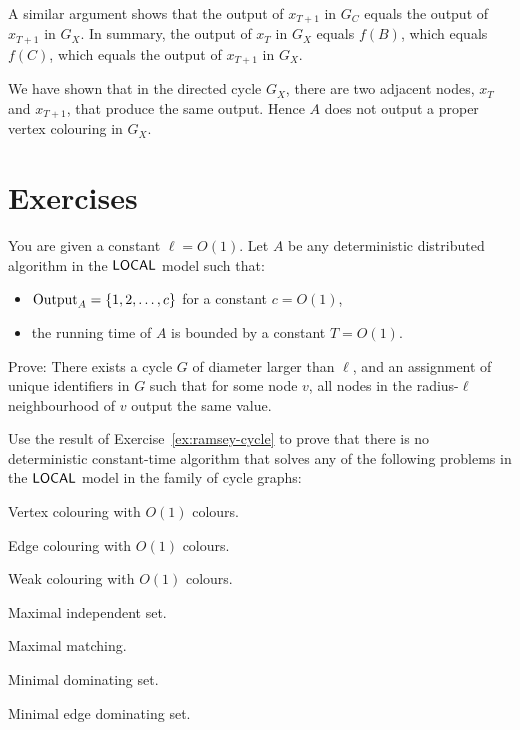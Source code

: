 A similar argument shows that the output of $x_{T+1}$ in $G_C$ equals the output of $x_{T+1}$ in $G_X$. In summary, the output of $x_{T}$ in $G_X$ equals $f(B)$, which equals $f(C)$, which equals the output of $x_{T+1}$ in $G_X$.

We have shown that in the directed cycle $G_X$, there are two adjacent nodes, $x_T$ and $x_{T+1}$, that produce the same output. Hence $A$ does not output a proper vertex colouring in $G_X$.


\section{Exercises}

\begin{ex}\label{ex:ramsey-cycle}
    You are given a constant $\ell = O(1)$. Let $A$ be any deterministic distributed algorithm in the $\textup{\sffamily LOCAL}$ model such that:
    \begin{itemize}[noitemsep]
        \item $\operatorname{Output}_A = \{1,2,\dotsc,c\}$ for a constant $c = O(1)$,
        \item the running time of $A$ is bounded by a constant $T = O(1)$.
    \end{itemize}
    Prove: There exists a cycle $G$ of diameter larger than $\ell$, and an assignment of unique identifiers in $G$ such that for some node $v$, all nodes in the radius-$\ell$ neighbourhood of $v$ output the same value.
\end{ex}

\begin{ex}\label{ex:ramsey-cycle-app}
    Use the result of Exercise~\ref{ex:ramsey-cycle} to prove that there is no deterministic constant-time algorithm that solves any of the following problems in the $\textup{\sffamily LOCAL}$ model in the family of cycle graphs:
    \begin{subex}[noitemsep]
        \item Vertex colouring with $O(1)$ colours.
        \item Edge colouring with $O(1)$ colours.
        \item Weak colouring with $O(1)$ colours.
        \item Maximal independent set.
        \item Maximal matching.
        \item Minimal dominating set.
        \item Minimal edge dominating set.
    \end{subex}
\end{ex}

